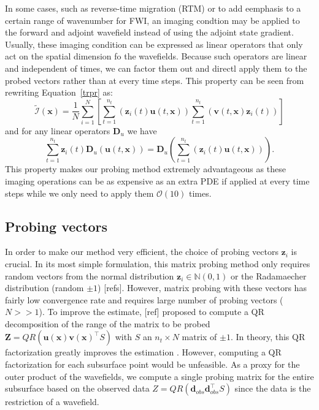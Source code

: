 \documentclass[]{segabs}
\begin{document}
In some cases, such as reverse-time migration (RTM) or to add eemphasis
to a certain range of wavenumber for FWI, an imaging condtion may be
applied to the forward and adjoint wavefield instead of using the
adjoint state gradient. Usually, these imaging condition can be
expressed as linear operators that only act on the spatial dimension fo
the wavefields. Because such operators are linear and independent of
times, we can factor them out and directl apply them to the probed
vectors rather than at every time steps. This property can be seen from
rewriting Equation~\ref{trpr} as:
%
\begin{equation}
    \tilde{\mathcal{I}}(\mathbf{x}) = \frac{1}{N} \sum_{i=1}^{N} \left [ \sum_{t=1}^{n_t} (\mathbf{z}_i(t) \mathbf{u}(t, \mathbf{x})) \sum_{t=1}^{n_t}(\mathbf{v}(t, \mathbf{x}) \mathbf{z}_i(t)) \right ]
\label{trpr_t}
\end{equation}
%
 and for any linear operators $\mathbf{D}_u$ we have
%
\begin{equation}
\sum_{t=1}^{n_t} \mathbf{z}_i(t) \mathbf{D}_u(\mathbf{u}(t, \mathbf{x})) = \mathbf{D}_u(\sum_{t=1}^{n_t} (\mathbf{z}_i(t) \mathbf{u}(t, \mathbf{x}))).
\label{lint}
\end{equation}
%
 This property makes our probing method extremely advantageous as these
imaging operations can be as expensive as an extra PDE if applied at
every time steps while we only need to apply them $\mathcal{O}(10)$
times.

\subsection{Probing vectors}\label{probing-vectors}

In order to make our method very efficient, the choice of probing
vectors $\mathbf{z}_i$ is crucial. In its most simple formulation, this
matrix probing method only requires random vectors from the normal
distribution $\mathbf{z}_i \in \mathbb{N}(0, 1)$ or the Radamaecher
distribution (random $\pm 1$) {[}refs{]}. However, matrix probing with
these vectors has fairly low convergence rate and requires large number
of probing vectors ($N >> 1$). To improve the estimate, {[}ref{]}
proposed to compute a QR decomposition of the range of the matrix to be
probed
$\mathbf{Z} = QR(\mathbf{u}(\mathbf{x})\mathbf{v}(\mathbf{x})^\top S)$
with $S$ an $n_t \times N$ matrix of $± 1$. In theory, this QR
factorization greatly improves the estimation \citep{refs}. However,
computing a QR factorization for each subsurface point would be
unfeasible. As a proxy for the outer product of the wavefields, we
compute a single probing matrix for the entire subsurface based on the
observed data $Z = QR(\mathbf{d}_{obs}\mathbf{d}_{obs}^\top S)$ since
the data is the restriction of a wavefield.
\end{document}
